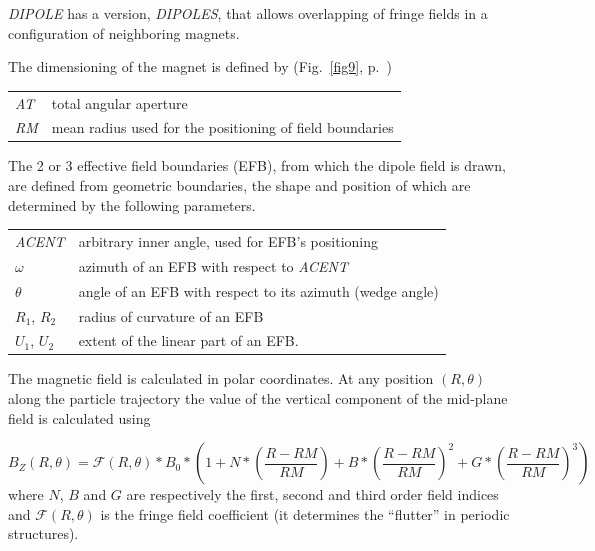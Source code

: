 \noindent \textsl{DIPOLE}  has a version, \textsl{DIPOLES}, that allows overlapping of fringe fields 
in a configuration of neighboring magnets. 

\bigskip

\noindent The dimensioning of the magnet is defined by (Fig.~\ref{fig9}, p.~\pageref{fig9})

\bigskip

 \begin{tabular}{>{\sl}l!{~:}l}
	 AT &  total angular aperture \\
	 RM & mean radius used for the positioning of field boundaries\\
 \end{tabular}

\bigskip

\noindent The 2 or 3 effective field boundaries (EFB), from which  the dipole field  is drawn, are
defined from geometric boundaries, the shape and position of which are determined by the 
following parameters. 

\bigskip

\begin{tabular}{l!{~:}l}
	 \textsl{ACENT} 
	    & arbitrary inner angle, used for EFB's positioning  \\
	$\omega$ &  azimuth of an EFB with respect to  \textsl{ACENT}\\
	$\theta$ & angle of an EFB with respect to its azimuth (wedge angle)\\ 
	$R_1$, $R_2$  &  radius of curvature of an EFB\\
	$U_1$, $U_2$  &  extent of the linear part of an EFB. 
\end{tabular}

\bigskip


 \noindent The magnetic field is calculated in  polar
coordinates. At  any position $(R,\theta)$ along the  particle trajectory 
the value of the vertical component of the mid-plane field is calculated using

 \begin{equation}
	 B_Z(R,\theta) =  \mathcal{F}(R,\theta) \ast  B_0 \ast  
	      \left(1+N \ast  
	           \left( \dfrac{R-RM }{ RM}\right) 
	           + B \ast  \left(\dfrac{R-RM }{ RM} \right)^2 
	           + G \ast  \left(\dfrac{R-RM }{ RM} \right)^3 
	      \right) 
 	\label{eqBDipole}
 \end{equation}
 where  $ N$, $B $ and $ G $ are  respectively  the first, second and
third order field indices and $ \mathcal{F}(R,\theta)$ is the fringe field coefficient (it determines the ``flutter'' 
in periodic structures). 


